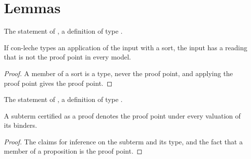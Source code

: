 \section{Lemmas}\label{sec:statements-lemmas}

\begin{definition}
  \label{def:EraseProof-sound_nonvacuous-statement}
  \leanok
   The statement of , a definition of type .
\end{definition}

\begin{lemma}
  \label{lem:EraseProof-sound_nonvacuous}
  \leanok
   If con-leche types an application of the input with a sort, the input has a reading that is not the proof point in every model.
\end{lemma}
\begin{proof}
  \leanok
   A member of a sort is a type, never the proof point, and applying the proof point gives the proof point.
\end{proof}

\begin{definition}
  \label{def:EraseProof-clCert_proof_pt-statement}
  \leanok
   The statement of , a definition of type .
\end{definition}

\begin{lemma}
  \label{lem:EraseProof-clCert_proof_pt}
  \leanok
   A subterm certified as a proof denotes the proof point under every valuation of its binders.
\end{lemma}
\begin{proof}
  \leanok
   The claims for inference on the subterm and its type, and the fact that a member of a proposition is the proof point.
\end{proof}

